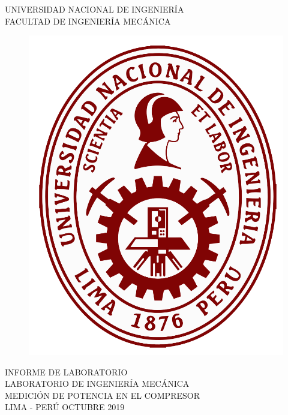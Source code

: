 \documentclass[a4paper,12pt]{report}
\begin{document}
\setcounter{page}{1}
\thispagestyle{empty}
\begin{center}
{\huge UNIVERSIDAD NACIONAL DE INGENIERÍA}\\[0.9cm]
{\Large FACULTAD DE INGENIERÍA MECÁNICA}\\[0.6in]
\end{center}
\begin{figure}[h]
\begin{center}
\includegraphics[scale=0.33]{logoUNI.png}
\vspace{0cm}
\end{center}
\end{figure}
\vspace{0.5cm}
\begin{center}
INFORME DE LABORATORIO\\
LABORATORIO DE INGENIERÍA MECÁNICA\\[14mm]
{\large MEDICIÓN DE POTENCIA EN EL COMPRESOR}\\[10mm]
\vfill
LIMA - PERÚ \hfill OCTUBRE 2019
\end{center}
\end{document}
